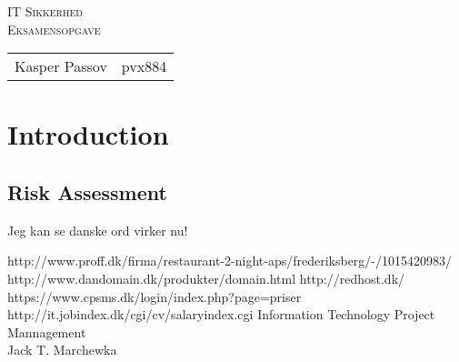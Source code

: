 \documentclass{article}
\begin{document}
\begin{titlepage}
\begin{center}
\textsc{\Large IT Sikkerhed}\\[0.5cm]
\textsc{Eksamensopgave}\\[0.5cm]
\vspace{2 cm}
\begin{tabular}{ll}
Kasper Passov & pvx884\\
\end{tabular}
\end{center}
\vspace{5 cm}
\newpage
\tableofcontents
\end{titlepage}

\section{Introduction}

\subsection{Risk Assessment}
Jeg kan se danske ord virker nu!
\newpage
\begin{thebibliography}{100}
http://www.proff.dk/firma/restaurant-2-night-aps/frederiksberg/-/1015420983/
http://www.dandomain.dk/produkter/domain.html
http://redhost.dk/
https://www.cpsms.dk/login/index.php?page=priser
http://it.jobindex.dk/cgi/cv/salaryindex.cgi
Information Technology Project Mannagement\\
Jack T. Marchewka
\end{thebibliography}
\end{document}
